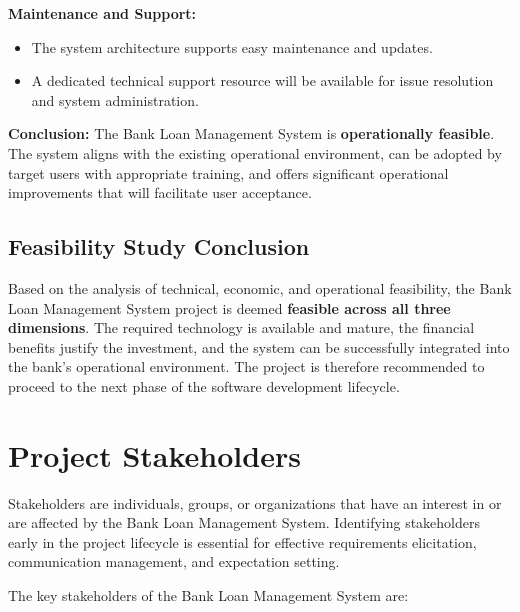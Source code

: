 \textbf{Maintenance and Support:}

\begin{itemize}
  \item The system architecture supports easy maintenance and updates.
  \item A dedicated technical support resource will be available for issue resolution and system administration.
\end{itemize}

\textbf{Conclusion:} The Bank Loan Management System is \textbf{operationally feasible}. The system aligns with the existing operational environment, can be adopted by target users with appropriate training, and offers significant operational improvements that will facilitate user acceptance.

\subsection{Feasibility Study Conclusion}

Based on the analysis of technical, economic, and operational feasibility, the Bank Loan Management System project is deemed \textbf{feasible across all three dimensions}. The required technology is available and mature, the financial benefits justify the investment, and the system can be successfully integrated into the bank's operational environment. The project is therefore recommended to proceed to the next phase of the software development lifecycle.

\section{Project Stakeholders}

Stakeholders are individuals, groups, or organizations that have an interest in or are affected by the Bank Loan Management System. Identifying stakeholders early in the project lifecycle is essential for effective requirements elicitation, communication management, and expectation setting.

The key stakeholders of the Bank Loan Management System are:

